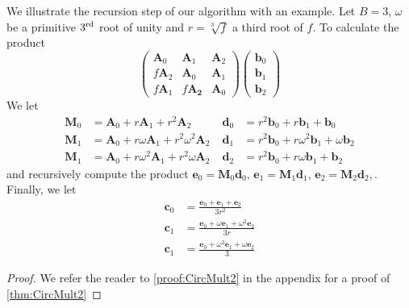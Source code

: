 \begin{example}
    We illustrate the recursion step of our algorithm with an example. Let \(B=3\), \(\omega\) be a primitive \(3\textsuperscript{rd}\) root of unity and \(r = \sqrt[3]{f}\) a third root of \(f\). To calculate the product
    \[\begin{pmatrix}
        \bm{A}_0 & \bm{A}_1 & \bm{A}_2 \\
        f \bm{A}_2 & \bm{A}_0 & \bm{A}_1 \\
        f \bm{A}_1 & f \bm{A_2} & \bm{A}_0
    \end{pmatrix} \begin{pmatrix}
        \bm{b}_0 \\ \bm{b}_1 \\ \bm{b}_2
    \end{pmatrix}\]
    We let
    \begin{align*}
        \bm{M}_0 &= \bm{A}_0 + r \bm{A}_1 + r^2 \bm{A}_2 \; & \bm{d}_0 &= r^2 \bm{b}_0 + r \bm{b}_1 + \bm{b}_0 \\
        \bm{M}_1 &= \bm{A}_0 + r \omega \bm{A}_1 + r^2 \omega^2 \bm{A}_2 \; & \bm{d}_1 &= r^2 \bm{b}_0 + r \omega^2 \bm{b}_1 + \omega \bm{b}_2 \\
        \bm{M}_1 &= \bm{A}_0 + r \omega^2 \bm{A}_1 + r^2 \omega \bm{A}_2 \; & \bm{d}_2 &= r^2 \bm{b}_0 + r \omega \bm{b}_1 + \bm{b}_2
    \end{align*}
    and recursively compute the product \(\bm{e}_0 = \bm{M}_0 \bm{d}_0,\, \bm{e}_1 = \bm{M}_1 \bm{d}_1,\, \bm{e}_2 = \bm{M}_2 \bm{d}_2,\). Finally, we let
    \begin{align*}
        \bm{c}_0 &= \frac{\bm{e}_0 + \bm{e}_1 + \bm{e}_2}{3r^2} \\
        \bm{c}_1 &= \frac{\bm{e}_0 + \omega \bm{e}_1 + \omega^2 \bm{e}_2}{3r} \\
        \bm{c}_1 &= \frac{\bm{e}_0 + \omega^2 \bm{e}_1 + \omega \bm{e}_2}{3}
    \end{align*}
\end{example}
\else
\begin{proof}
    We refer the reader to \cref{proof:CircMult2} in the appendix for a proof of \cref{thm:CircMult2}
\end{proof}
\fi